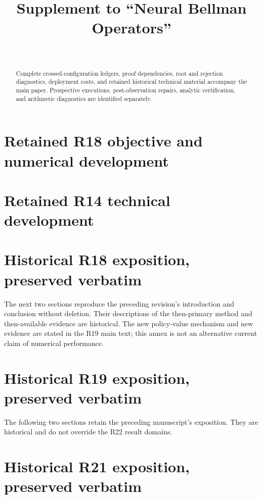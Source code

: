 \documentclass[ecta]{econsocart}
\theoremstyle{remark}
\begin{document}
\begin{frontmatter}
\title{Supplement to ``Neural Bellman Operators''}
\begin{aug}
\author[id=au1,addressref={add1}]{~}
\address[id=add1]{}
\end{aug}
\begin{abstract}Complete crossed-configuration ledgers, proof dependencies, root and rejection diagnostics, deployment costs, and retained historical technical material accompany the main paper. Prospective executions, post-observation repairs, analytic certification, and arithmetic diagnostics are identified separately.\end{abstract}
\end{frontmatter}



\section{Retained R18 objective and numerical development}


\section{Retained R14 technical development}

\clearpage
\section{Historical R18 exposition, preserved verbatim}
The next two sections reproduce the preceding revision's introduction and conclusion without deletion. Their descriptions of the then-primary method and then-available evidence are historical. The new policy-value mechanism and new evidence are stated in the R19 main text; this annex is not an alternative current claim of numerical performance.


\clearpage
\section{Historical R19 exposition, preserved verbatim}
The following two sections retain the preceding manuscript's exposition. They are historical and do not override the R22 result domains.


\clearpage
\section{Historical R21 exposition, preserved verbatim}


\clearpage

\end{document}

